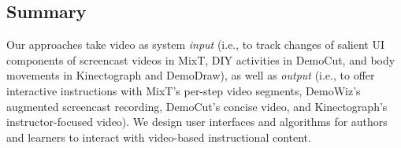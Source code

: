 \subsection{Summary}
Our approaches take video as system \emph{input} (i.e., to track changes of salient UI components of screencast videos in MixT, DIY activities in DemoCut, and body movements in Kinectograph and DemoDraw), as well as \emph{output} (i.e., to offer interactive instructions with MixT's per-step video segments, DemoWiz's augmented screencast recording, DemoCut's concise video, and Kinectograph's instructor-focused video). We design user interfaces and algorithms for authors and learners to interact with video-based instructional content.
